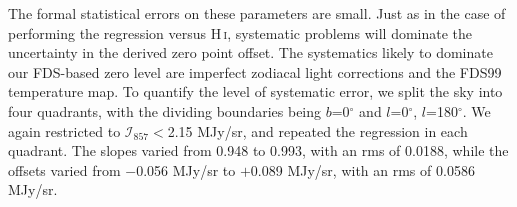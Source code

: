 \documentclass{emulateapj}
\newcommand{\PLANCK}{{\it Planck}}
\begin{document}
The formal statistical errors on these parameters are small. Just as in the 
case of performing the regression versus  H\,\textsc{i}, systematic problems 
will dominate the uncertainty in the derived zero point offset. The systematics
likely to dominate our FDS-based zero level are imperfect zodiacal light 
corrections and the FDS99 temperature map. To quantify the level of systematic 
error, we split the sky into four quadrants, with the dividing boundaries being
 $b$=0$^{\circ}$ and $l$=0$^{\circ}$, $l$=180$^{\circ}$. We again restricted to
 $\mathcal{I}_{857}$$<$2.15 MJy/sr, and repeated the regression in each 
quadrant. The slopes varied from 0.948 to 0.993, with an rms of 0.0188, while 
the offsets varied from $-$0.056 MJy/sr to $+$0.089 MJy/sr, with an rms of 
0.0586 MJy/sr.






\end{document}

